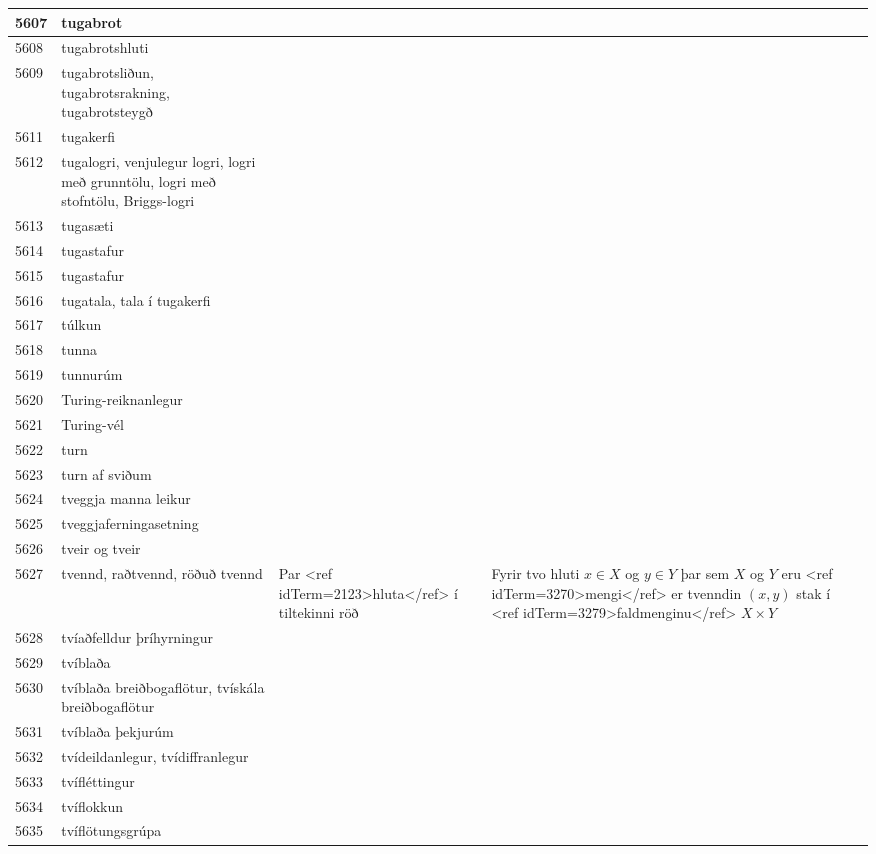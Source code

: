 \begin{longtable}{p{}|p{}|p{}|p{}|p{}}
\hline
5607 & tugabrot &  &  &  \\
\hline
5608 & tugabrotshluti &  &  &  \\
\hline
5609 & tugabrotsliðun, tugabrotsrakning, tugabrotsteygð &  &  &  \\
\hline
5611 & tugakerfi &  &  &  \\
\hline
5612 & tugalogri, venjulegur logri, logri með grunntölu, logri með stofntölu, Briggs-logri &  &  &  \\
\hline
5613 & tugasæti &  &  &  \\
\hline
5614 & tugastafur &  &  &  \\
\hline
5615 & tugastafur &  &  &  \\
\hline
5616 & tugatala, tala í tugakerfi &  &  &  \\
\hline
5617 & túlkun &  &  &  \\
\hline
5618 & tunna &  &  &  \\
\hline
5619 & tunnurúm &  &  &  \\
\hline
5620 & Turing-reiknanlegur &  &  &  \\
\hline
5621 & Turing-vél &  &  &  \\
\hline
5622 & turn &  &  &  \\
\hline
5623 & turn af sviðum &  &  &  \\
\hline
5624 & tveggja manna leikur &  &  &  \\
\hline
5625 & tveggjaferningasetning &  &  &  \\
\hline
5626 & tveir og tveir &  &  &  \\
\hline
5627 & tvennd, raðtvennd, röðuð tvennd & Par <ref idTerm=2123>hluta</ref> í tiltekinni röð & Fyrir tvo hluti $x \in X$ og $y \in Y$ þar sem $X$ og $Y$ eru <ref idTerm=3270>mengi</ref> er tvenndin $(x,y)$ stak í <ref idTerm=3279>faldmenginu</ref> $X \times Y$ &  \\
\hline
5628 & tvíaðfelldur þríhyrningur &  &  &  \\
\hline
5629 & tvíblaða &  &  &  \\
\hline
5630 & tvíblaða breiðbogaflötur, tvískála breiðbogaflötur &  &  &  \\
\hline
5631 & tvíblaða þekjurúm &  &  &  \\
\hline
5632 & tvídeildanlegur, tvídiffranlegur &  &  &  \\
\hline
5633 & tvífléttingur &  &  &  \\
\hline
5634 & tvíflokkun &  &  &  \\
\hline
5635 & tvíflötungsgrúpa &  &  &  \\

\end{longtable}
